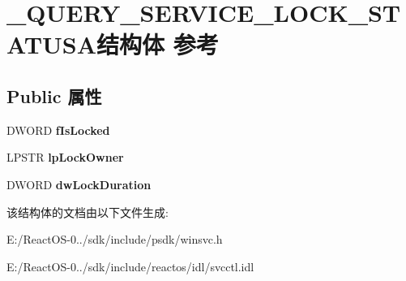 \hypertarget{struct___q_u_e_r_y___s_e_r_v_i_c_e___l_o_c_k___s_t_a_t_u_s_a}{}\section{\+\_\+\+Q\+U\+E\+R\+Y\+\_\+\+S\+E\+R\+V\+I\+C\+E\+\_\+\+L\+O\+C\+K\+\_\+\+S\+T\+A\+T\+U\+S\+A结构体 参考}
\label{struct___q_u_e_r_y___s_e_r_v_i_c_e___l_o_c_k___s_t_a_t_u_s_a}
\subsection*{Public 属性}
\begin{DoxyCompactItemize}
\item 
\mbox{\label{struct___q_u_e_r_y___s_e_r_v_i_c_e___l_o_c_k___s_t_a_t_u_s_a_a22047c2900cf21d4c7d87f2e14b3bab2}} 
D\+W\+O\+RD {\bfseries f\+Is\+Locked}
\item 
\mbox{\label{struct___q_u_e_r_y___s_e_r_v_i_c_e___l_o_c_k___s_t_a_t_u_s_a_a2f60fd5a445ccadac06db76aa2345e80}} 
L\+P\+S\+TR {\bfseries lp\+Lock\+Owner}
\item 
\mbox{\label{struct___q_u_e_r_y___s_e_r_v_i_c_e___l_o_c_k___s_t_a_t_u_s_a_aed5eb1fd3413c9a7b793002a23980116}} 
D\+W\+O\+RD {\bfseries dw\+Lock\+Duration}
\end{DoxyCompactItemize}


该结构体的文档由以下文件生成\+:\begin{DoxyCompactItemize}
\item 
E\+:/\+React\+O\+S-\/0../sdk/include/psdk/winsvc.\+h\item 
E\+:/\+React\+O\+S-\/0../sdk/include/reactos/idl/svcctl.\+idl\end{DoxyCompactItemize}
